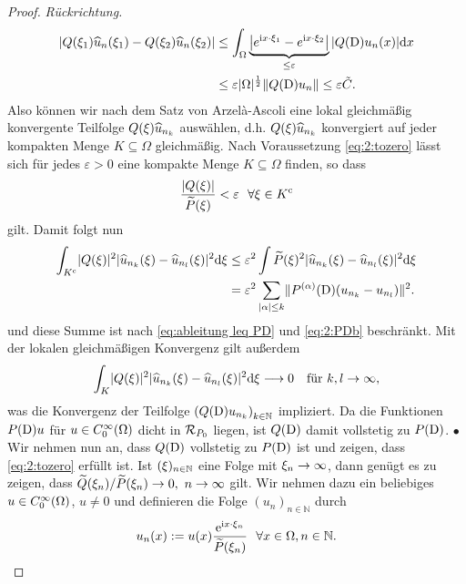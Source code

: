 \begin{proof} {\it Rückrichtung.}
\begin{align}
| Q(\xi_1)\widehat{u}_n(\xi_1) - Q(\xi_2)\widehat{u}_n(\xi_2)| & \leq \int_{\Omega}  \underbrace{\left| e^{\mathrm i x \cdot \xi_1} - e^{\mathrm i x \cdot \xi_2} \right| }_{\leq \varepsilon} | Q(\mathrm D) u_n(x)| \mathrm{d}x 
\\ & \leq \varepsilon |\Omega|^{\frac{1}{2}} \Vert Q(\mathrm D)u_n \Vert \leq \varepsilon \tilde{C}.
\end{align}
Also können wir nach dem Satz von Arzel\`a-Ascoli eine lokal gleichmäßig konvergente Teilfolge $Q(\xi)\widehat{u}_{n_k}$ auswählen, d.h. $Q(\xi)\widehat{u}_{n_k}$ konvergiert auf jeder kompakten Menge $K \subseteq \Omega$ gleichmäßig.
Nach Voraussetzung \eqref{eq:2:tozero} lässt sich für jedes $\varepsilon > 0$ eine kompakte Menge $K \subseteq \Omega$ finden, so dass 
\begin{equation}
\frac{\abs{Q(\x)}}{\til{P}(\x)} <\varepsilon \ \ \forall \x \in K^{\mathrm{c}}
\end{equation}
gilt. Damit folgt nun
\begin{align}
\int_{K^{\mathrm c}}\lvert Q(\xi)\rvert^2\lvert\widehat{u}_{n_k}(\xi)-\widehat{u}_{n_l}(\xi)\rvert^2\mathrm{d}\xi
&\leq\varepsilon^2\int\widetilde{P}(\xi)^2\lvert\widehat{u}_{n_k}(\xi)-\widehat{u}_{n_l}(\xi)\rvert^2\mathrm{d}\xi\\
&=\varepsilon^2\sum_{|\alpha| \leq k}\lVert P^{(\alpha)}(\mathrm D)(u_{n_k}-u_{n_l})\rVert^2.\label{eq:2:Kcsum}
\end{align}
und diese Summe ist nach \eqref{eq:ableitung leq PD}
und \eqref{eq:2:PDb} beschränkt.
Mit der lokalen gleichmäßigen Konvergenz gilt außerdem
\begin{equation}
\int_K\lvert Q(\xi)\rvert^2\lvert\widehat{u}_{n_k}(\xi)-\widehat{u}_{n_l}(\xi)\rvert^2\mathrm{d}\xi\longrightarrow0
\quad\text{für}~ k,l \rightarrow \infty,
\end{equation}
was die Konvergenz der Teilfolge $\left(Q(\mathrm D)u_{n_k} \right)_{k \in \mathbb{N}}$ impliziert. Da die Funktionen $P(\mathrm D)u$ für $u\in C^\infty_0(\Omega)$ dicht in $\mathcal R_{P_0}$ liegen, ist $Q(\mathrm D)$ damit vollstetig zu $P(\mathrm D)$.
$\bullet$
Wir nehmen nun an, dass $Q(\mathrm D)$ vollstetig zu $P(\mathrm D)$ ist und zeigen, dass \eqref{eq:2:tozero} erfüllt ist.
 Ist $(\xi)_{n \in \mathbb{N}}$ eine Folge mit $\xi_n \rightarrow \infty$, dann genügt es zu zeigen, dass $\widetilde{Q}(\xi_{n})/\widetilde{P}(\xi_{n})\to0, \ n \rightarrow \infty$ gilt.
Wir nehmen dazu ein beliebiges $u\in C^\infty_0(\Omega)$, $u\neq0$ und definieren die Folge $(u_n)_{n \in \mathbb{N}}$ durch
\begin{equation}
u_n(x):=u(x)\frac{\e^{\i x \cdot \x_n}}{\til{P}(\x_n)}\ \ \forall x \in \Omega, n \in \mathbb{N}.

\end{equation}
\end{proof}
